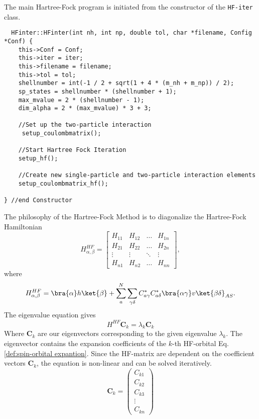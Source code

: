 The main Hartree-Fock program is initiated from the constructor of the \texttt{HF-iter} class. 
\begin{lstlisting}
  HFinter::HFinter(int nh, int np, double tol, char *filename, Config *Conf) {
    this->Conf = Conf;
    this->iter = iter;
    this->filename = filename;
    this->tol = tol;
    shellnumber = int(-1 / 2 + sqrt(1 + 4 * (m_nh + m_np)) / 2);
    sp_states = shellnumber * (shellnumber + 1);
    max_mvalue = 2 * (shellnumber - 1);
    dim_alpha = 2 * (max_mvalue) * 3 + 3;

    //Set up the two-particle interaction
     setup_coulombmatrix();
    
    //Start Hartree Fock Iteration  
    setup_hf();
    
    //Create new single-particle and two-particle interaction elements
    setup_coulombmatrix_hf();

} //end Constructor
\end{lstlisting}
%
The philosophy of the Hartree-Fock Method is to diagonalize the Hartree-Fock Hamiltonian
\begin{equation}
H_{\alpha,\beta}^{HF} = \begin{bmatrix} H_{11} & H_{12} & \hdots & H_{1n} \\ H_{21} & H_{22} & \hdots & H_{2n} \\ \vdots & \vdots & \ddots & \vdots \\ H_{n1} & H_{n2} & \hdots & H_{nn} \end{bmatrix},
  \label{HF-Hamiltonian}
\end{equation}
%
where 
\begin{equation}
  H_{\alpha,\beta}^{HF} = \bra{\alpha}h\ket{\beta} + \sum_{a}^N \sum_{\gamma\delta}C_{a\gamma}^* C_{a\delta}^* \bra{\alpha \gamma} v \ket{\beta \delta}_{AS}.
\end{equation}
%
The eigenvalue equation gives 
\begin{equation}
H^{HF} \mathbf{C}_k = \lambda_k \mathbf{C}_k
  \label{HF-eigenvalue}
\end{equation}
%
Where $\mathbf{C}_k$ are our eigenvectors corresponding to the given eigenvalue $\lambda_k$. The eigenvector contains the expansion coefficients of the $k$-th HF-orbital Eq. \ref{def:spin-orbital expantion}. Since the HF-matrix are dependent on the coefficient vectors $\mathbf{C}_k$, the equation is non-linear and can be solved iteratively. 
\begin{equation}
\mathbf{C}_k = \begin{pmatrix}C_{k1} \\ C_{k2} \\ C_{k3} \\ \vdots \\ C_{kn} \end{pmatrix}
 \label{coeff}
\end{equation}
%

